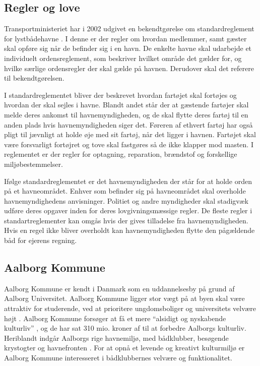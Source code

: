 
\subsection{Regler og love}
Transportministeriet har i 2002 udgivet en bekendtgørelse om standardreglement for lystbådehavne \cite{standardreglement}. I denne er der regler om hvordan medlemmer, samt gæster skal opføre sig når de befinder sig i en havn. De enkelte havne skal udarbejde et individuelt ordensreglement, som beskriver hvilket område det gælder for, og hvilke særlige ordensregler der skal gælde på havnen. Derudover skal det referere til bekendtgørelsen.

I standardreglementet bliver der beskrevet hvordan fartøjet skal fortøjes og hvordan der skal sejles i havne. Blandt andet står der at gæstende fartøjer skal melde deres ankomst til havnemyndigheden, og de skal flytte deres fartøj til en anden plads hvis havnemyndigheden siger det. Føreren af ethvert fartøj har også pligt til jævnligt at holde øje med sit fartøj, når det ligger i havnen. Fartøjet skal være forsvarligt fortøjret og tove skal fastgøres så de ikke klapper mod masten. I reglementet er der regler for optagning, reparation, brændstof og forskellige miljøbestemmelser.

Ifølge standardreglementet er det havnemyndigheden der står for at holde orden på et havneområdet. Enhver som befinder sig på havneområdet skal overholde havnemyndighedens anvisninger. Politiet og andre myndigheder skal stadigvæk udføre deres opgaver inden for deres lovgivningsmæssige regler. De fleste regler i standartreglementer kan omgås hvis der gives tilladelse fra havnemyndigheden. Hvis en regel ikke bliver overholdt kan havnemyndigheden flytte den pågældende båd for ejerens regning.


\subsection{Aalborg Kommune}

Aalborg Kommune er kendt i Danmark som en uddannelsesby på grund af Aalborg Universitet. Aalborg Kommune ligger stor vægt på at byen skal være attraktiv for studerende, ved at prioritere ungdomsboliger og universitets velvære højt \cite{udd-strat-aalborg}. Aalborg Kommune forsøger at få et mere \enquote{alsidigt og nyskabende kulturliv} \cite{aalborgKulturPolitik}, og de har sat 310 mio. kroner af til at forbedre Aalborgs kulturliv. Heriblandt indgår Aalborgs rige havnemiljø, med bådklubber, besøgende krystogter og havnefronten \cite{AalborgHavnefront}. For at opnå et levende og kreativt kulturmiljø er Aalborg Kommune interesseret i bådklubbernes velvære og funktionalitet.

